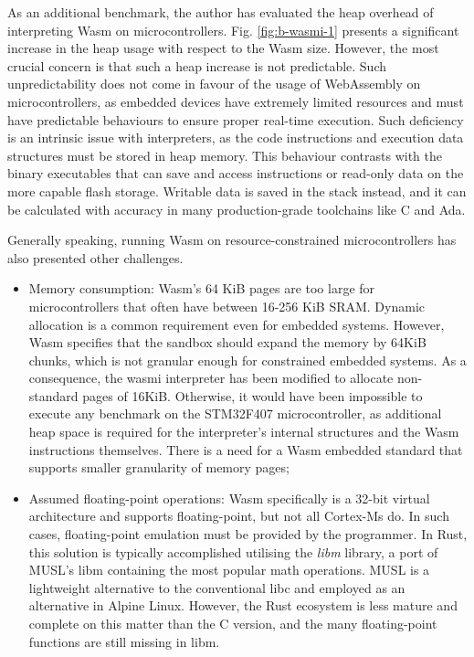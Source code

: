 As an additional benchmark, the author has evaluated the heap overhead of interpreting Wasm on microcontrollers. Fig. \ref{fig:b-wasmi-1} presents a significant increase in the heap usage with respect to the Wasm size. However, the most crucial concern is that such a heap increase is not predictable. Such unpredictability does not come in favour of the usage of WebAssembly on microcontrollers, as embedded devices have extremely limited resources and must have predictable behaviours to ensure proper real-time execution. Such deficiency is an intrinsic issue with interpreters, as the code instructions and execution data structures must be stored in heap memory. This behaviour contrasts with the binary executables that can save and access instructions or read-only data on the more capable flash storage. Writable data is saved in the stack instead, and it can be calculated with accuracy in many production-grade toolchains like C and Ada.

Generally speaking, running Wasm on resource-constrained microcontrollers has also presented other challenges.

\begin{itemize}
    \item Memory consumption: Wasm's 64 KiB pages are too large for microcontrollers that often have between 16-256 KiB SRAM. Dynamic allocation is a common requirement even for embedded systems. However, Wasm specifies that the sandbox should expand the memory by 64KiB chunks, which is not granular enough for constrained embedded systems. As a consequence, the wasmi interpreter has been modified to allocate non-standard pages of 16KiB. Otherwise, it would have been impossible to execute any benchmark on the STM32F407 microcontroller, as additional heap space is required for the interpreter's internal structures and the Wasm instructions themselves. There is a need for a Wasm embedded standard that supports smaller granularity of memory pages;
    \item Assumed floating-point operations: Wasm specifically is a 32-bit virtual architecture and supports floating-point, but not all Cortex-Ms do. In such cases, floating-point emulation must be provided by the programmer. In Rust, this solution is typically accomplished utilising the \emph{libm} library, a port of MUSL's libm containing the most popular math operations. MUSL is a lightweight alternative to the conventional libc and employed as an alternative in Alpine Linux. However, the Rust ecosystem is less mature and complete on this matter than the C version, and the many floating-point functions are still missing in libm. 
\end{itemize}

